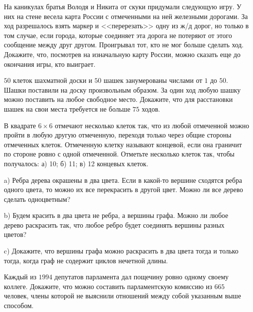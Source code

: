 
\begin{exersize}
	На каникулах братья Володя и Никита от скуки придумали следующую игру. У них на стене весела карта России с отмеченными на ней железными дорогами. За ход разрешалось взять маркер и <<перерезать>> одну из ж/д дорог, но только в том случае, если города, которые соединяет эта дорога не потеряют от этого сообщение между друг другом. Проигрывал тот, кто не мог больше сделать ход. Докажите, что, посмотрев на изначальную карту России, можно сказать еще до окончания игры, кто выиграет.
\end{exersize}

\begin{exersize}
	$50$ клеток шахматной доски и $50$ шашек занумерованы числами от $1$ до $50$. Шашки поставили на доску произвольным образом. За один ход любую шашку можно поставить на любое свободное место. Докажите, что для расстановки шашек на свои места требуется не больше $75$ ходов.
\end{exersize}

\begin{exersize}
	В квадрате $6 \times 6$ отмечают несколько клеток так, что из любой отмеченной можно пройти в любую другую отмеченную, переходя только через общие стороны отмеченных клеток. Отмеченную клетку называют концевой, если она граничит по стороне ровно с одной отмеченной. Отметьте несколько клеток так, чтобы получалось: а) 10; б) 11; в) 12 концевых клеток.
\end{exersize}

\begin{exersize}
	a) Ребра дерева окрашены в два цвета. Если в какой-то вершине сходятся ребра одного цвета, то можно их все перекрасить в другой цвет. Можно ли все дерево сделать одноцветным?
	
	b) Будем красить в два цвета не ребра, а вершины графа. Можно ли любое дерево раскрасить так, что любое ребро будет соединять вершины разных цветов?
	
	c) Докажите, что вершины графа можно раскрасить в два цвета тогда и только тогда, когда граф не содержит циклов нечетной длины.
\end{exersize}	

\begin{exersize}
	Каждый из $1994$ депутатов парламента дал пощечину ровно одному своему коллеге. Докажите, что можно составить парламентскую комиссию из $665$ человек, члены которой не выяснили отношений между собой указанным выше способом.
\end{exersize}	

